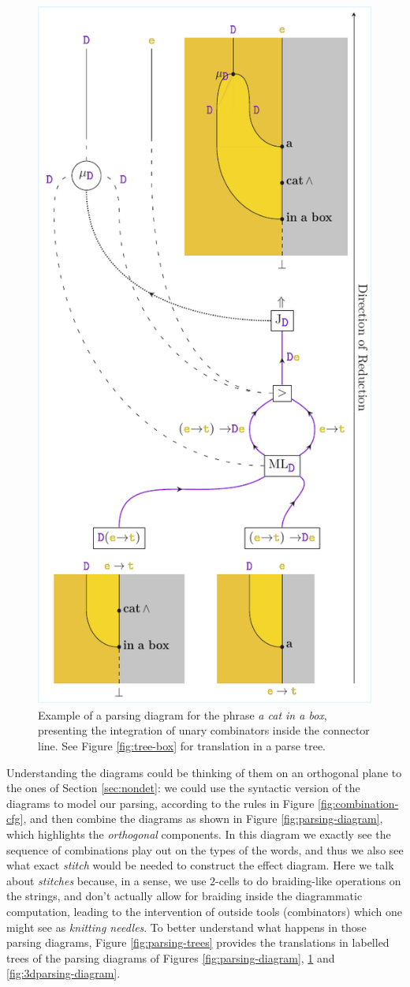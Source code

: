 \begin{figure}
	\centering
	\includegraphics[width=.45\textwidth]{parsing-diagram2.pdf}
	\caption{Example of a parsing diagram for the phrase
		\emph{a cat in a box}, presenting the integration of unary combinators
		inside the connector line. See Figure \ref{fig:tree-box} for translation in
		a parse tree.}
	\label{fig:parsing-diagram2}
\end{figure}
Understanding the diagrams could be thinking of them on an orthogonal plane to
the ones of Section \ref{sec:nondet}: we could use the syntactic version of the
diagrams to model our parsing, according to the rules in Figure
\ref{fig:combination-cfg}, and then combine the diagrams as shown in Figure
\ref{fig:parsing-diagram}, which highlights the \emph{orthogonal} components.
In this diagram we exactly see the sequence of combinations play out on the
types of the words, and thus we also see what exact \emph{stitch} would
be needed to construct the effect diagram.
Here we talk about \emph{stitches} because, in a sense, we use $2$-cells
to do braiding-like operations on the strings, and don't actually allow for
braiding inside the diagrammatic computation, leading to the intervention of
outside tools (combinators) which one might see as \emph{knitting needles}.
To better understand what happens in those parsing diagrams, Figure
\ref{fig:parsing-trees} provides the translations in labelled trees of the
parsing diagrams of Figures \ref{fig:parsing-diagram},
\ref{fig:parsing-diagram2} and \ref{fig:3dparsing-diagram}.


